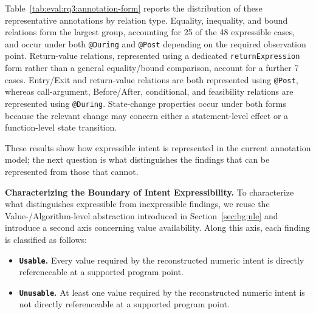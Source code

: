 \documentclass[11pt,oneside]{report}
\theoremstyle{plain}
\theoremstyle{definition}
\theoremstyle{remark}
\begin{document}
Table~\ref{tab:eval:rq3:annotation-form} reports the distribution of these representative annotations by relation type. Equality, inequality, and bound relations form the largest group, accounting for 25 of the 48 expressible cases, and occur under both \texttt{@During} and \texttt{@Post} depending on the required observation point. Return-value relations, represented using a dedicated \texttt{returnExpression} form rather than a general equality/bound comparison, account for a further 7 cases. Entry/Exit and return-value relations are both represented using \texttt{@Post}, whereas call-argument, Before/After, conditional, and feasibility relations are represented using \texttt{@During}. State-change properties occur under both forms because the relevant change may concern either a statement-level effect or a function-level state transition.

These results show how expressible intent is represented in the current annotation model; the next question is what distinguishes the findings that can be represented from those that cannot.

\smallskip
\noindent\textbf{Characterizing the Boundary of Intent Expressibility.}
\label{subsubsec:eval:rq3:boundary}
To characterize what distinguishes expressible from inexpressible findings, we
reuse the Value-/Algorithm-level abstraction introduced in
Section~\ref{sec:bg:nle} and introduce a second axis concerning value
availability. Along this axis, each finding is classified as follows:

\begin{itemize}
    \item \textbf{\texttt{Usable}.}
    Every value required by the reconstructed numeric intent is directly
    referenceable at a supported program point.

    \item \textbf{\texttt{Unusable}.}
    At least one value required by the reconstructed numeric intent is not
    directly referenceable at a supported program point.
\end{itemize}
\end{document}
